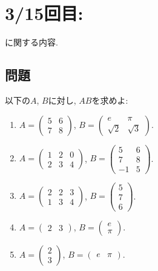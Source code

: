 \newpage
\section{3/15回目: }
に関する内容.
\subsection{問題}
\begin{quiz}
  以下の$A$, $B$に対し, $AB$を求めよ:
  \begin{enumerate}
  \item
    $A=\begin{pmatrix}5&6\\7&8\end{pmatrix}$,
    $B=\begin{pmatrix}e&\pi\\\sqrt{2}&\sqrt{3}\end{pmatrix}$.
  \item
    $A=\begin{pmatrix}1&2&0\\2&3&4\end{pmatrix}$,
    $B=\begin{pmatrix}5&6\\7&8\\-1&5\end{pmatrix}$.
  \item
    $A=\begin{pmatrix}2&2&3\\1&3&4\end{pmatrix}$,
    $B=\begin{pmatrix}5\\7\\6\end{pmatrix}$.
  \item
    $A=\begin{pmatrix}2&3\end{pmatrix}$,
    $B=\begin{pmatrix}e\\\pi\end{pmatrix}$.
  \item
    $A=\begin{pmatrix}2\\3\end{pmatrix}$,
    $B=\begin{pmatrix}e&\pi\end{pmatrix}$.
  \end{enumerate}
\end{quiz}
